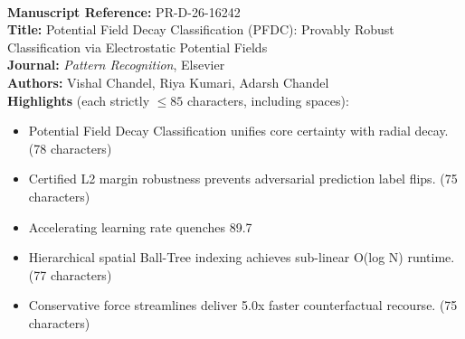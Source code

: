 \documentclass[11pt]{article}
\begin{document}
\\[1em]
\noindent\textbf{Manuscript Reference:} PR-D-26-16242\\
\textbf{Title:} Potential Field Decay Classification (PFDC): Provably Robust Classification via Electrostatic Potential Fields\\
\textbf{Journal:} \textit{Pattern Recognition}, Elsevier\\
\textbf{Authors:} Vishal Chandel, Riya Kumari, Adarsh Chandel\\[1.5em]
\noindent\textbf{Highlights} (each strictly $\le 85$ characters, including spaces):
\begin{itemize}
    \item Potential Field Decay Classification unifies core certainty with radial decay. (78 characters)
    \item Certified L2 margin robustness prevents adversarial prediction label flips. (75 characters)
    \item Accelerating learning rate quenches 89.7%
    \item Hierarchical spatial Ball-Tree indexing achieves sub-linear O(log N) runtime. (77 characters)
    \item Conservative force streamlines deliver 5.0x faster counterfactual recourse. (75 characters)
\end{itemize}
\end{document}
